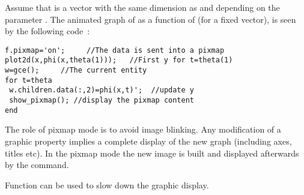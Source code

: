 Assume that  is a vector with the same 
dimension as 
and depending on the parameter . The animated graph of  
as a function of  (for a fixed  vector), is seen by
the following code~:
\begin{verbatim}
f.pixmap='on';     //The data is sent into a pixmap
plot2d(x,phi(x,theta(1)));   //First y for t=theta(1)
w=gce();     //The current entity
for t=theta
 w.children.data(:,2)=phi(x,t)';  //update y
 show_pixmap(); //display the pixmap content
end
\end{verbatim}
The role of pixmap mode is to avoid image blinking. Any modification
of a graphic property implies a complete display of the new graph
(including axes, titles etc). In the pixmap mode the new image is
built and displayed afterwards by the   command.

Function  can be used to slow down the graphic display.

